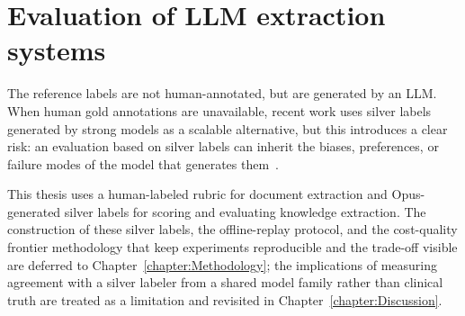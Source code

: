 \section{Evaluation of LLM extraction systems}\label{section:background-evaluation-of-llm-extraction-systems}

The reference labels are not human-annotated, but are generated by an LLM. When human gold annotations are unavailable, recent work uses silver labels generated by strong models as a scalable alternative, but this introduces a clear risk: an evaluation based on silver labels can inherit the biases, preferences, or failure modes of the model that generates them~\parencite{zheng2023judgingllmasajudgemtbench, horn2025benchmarkingdocumentparsers}.

This thesis uses a human-labeled rubric for document extraction and Opus-generated silver labels for scoring and evaluating knowledge extraction. The construction of these silver labels, the offline-replay protocol, and the cost-quality frontier methodology that keep experiments reproducible and the trade-off visible are deferred to Chapter~\ref{chapter:Methodology}; the implications of measuring agreement with a silver labeler from a shared model family rather than clinical truth are treated as a limitation and revisited in Chapter~\ref{chapter:Discussion}.